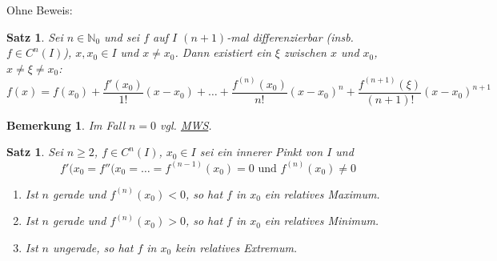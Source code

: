 \documentclass[14pt,titlepage,ngerman,a4paper,headsepline,DIV15,halfparskip*]{scrartcl}
\newcommand{\N}{\mathbb{N}}
\theoremstyle{named}
\theoremstyle{dotless}
\newtheorem{satz}[namedtheorem]{Satz}
\newtheorem*{bemerkung}{Bemerkung}
\begin{document}
Ohne Beweis:

\begin{satz} \label{9.20:satz-Taylor}
	Sei $n \in \N_{0}$ und sei $f$ auf $I$ $(n+1)$-mal differenzierbar (insb. $f \in C^{n}(I)$), $x, x_{0} \in I$ und $x \neq x_{0}$. Dann existiert ein $\xi$ zwischen $x$ und $x_{0}$, $x \neq \xi \neq x_{0}$:
		$$ f(x) = f(x_{0}) + \frac{f'(x_{0})}{1!} (x - x_{0}) + \dotsc + \frac{f^{(n)}(x_{0})}{n!} (x - x_{0})^{n} + \frac{f^{(n+1)}(\xi)}{(n+1)!} (x - x_{0})^{n+1} $$
\end{satz}

\begin{bemerkung}
	Im Fall $n = 0$ vgl. \hyperref[9.7:prop-Mittelwertsatz]{MWS}.	
\end{bemerkung}


\begin{satz} \label{9.21:satz}
	Sei $n \geq 2$, $f \in C^{n}(I)$, $x_{0} \in I$ sei ein innerer Pinkt von $I$ und
	$$ f'(x_{0} = f''(x_{0} = \dotsc = f^{(n-1)}(x_{0}) = 0 \text{ und } f^{(n)}(x_{0}) \neq 0 $$
	\begin{enumerate}
		\item Ist $n$ gerade und $f^{(n)}(x_{0}) < 0$, so hat $f$ in $x_{0}$ ein relatives Maximum.
		\item Ist $n$ gerade und $f^{(n)}(x_{0}) > 0$, so hat $f$ in $x_{0}$ ein relatives Minimum.
		\item Ist $n$ ungerade, so hat $f$ in $x_{0}$ kein relatives Extremum. 
	\end{enumerate}	
\end{satz}
\end{document}
